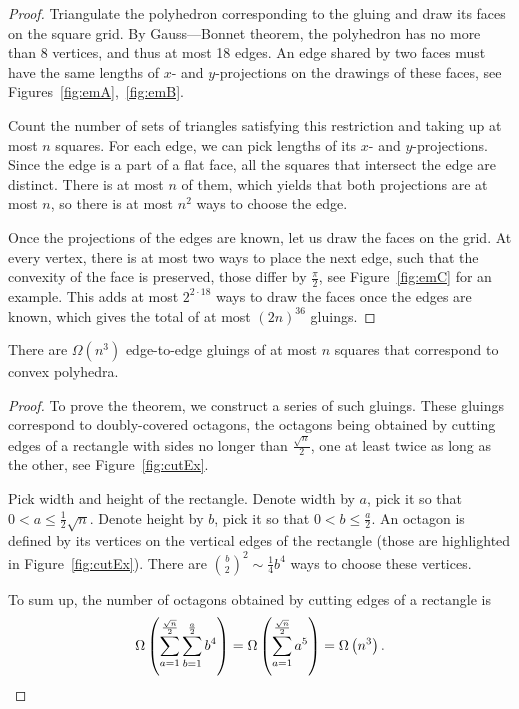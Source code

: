 \documentclass[a4paper,11pt]{article}
\begin{document}
\begin{proof}
	Triangulate the polyhedron corresponding to the gluing and draw its faces on the square grid. By Gauss—Bonnet theorem, the polyhedron has no more than 8 vertices, and thus at most 18 edges. An edge shared by two faces must have the same lengths of $x$- and $y$-projections on the drawings of these faces, see Figures~\ref{fig:emA},~\ref{fig:emB}.



Count the number of sets of triangles satisfying this restriction and taking up at most $n$ squares. For each edge, we can pick lengths of its $x$- and $y$-projections. Since the edge is a part of a flat face, all the squares that intersect the edge are distinct. There is at most $n$ of them, which yields that both projections are at most $n$, so there is at most $n^2$ ways to choose the edge.

Once the projections of the edges are known, let us draw the faces on the grid. At every vertex, there is at most two ways to place the next edge, such that the convexity of the face is preserved, those differ by $\frac{\pi}{2}$, see Figure~\ref{fig:emC} for an example. This adds at most $2^{2 \cdot 18}$ ways to draw the faces once the edges are known, which gives the total of at most $(2n)^{36}$ gluings.
\end{proof}

\begin{theorem} \label{thm:n3}
	There are $\Omega \left( n^3 \right)$ edge-to-edge gluings of at most $n$ squares that correspond to convex polyhedra.
\end{theorem}

\begin{proof}
To prove the theorem, we construct a series of such gluings. These gluings correspond to doubly-covered octagons, the octagons being obtained by cutting edges of a rectangle with sides no longer than $\frac{\sqrt{n}}{2}$, one at least twice as long as the other, see Figure~\ref{fig:cutEx}.



Pick width and height of the rectangle. Denote width by $a$, pick it so that $0 < a \le \frac12 \sqrt{n}$. Denote height by $b$, pick it so that $0 < b \le \frac{a}2$. An octagon is defined by its vertices on the vertical edges of the rectangle (those are highlighted in Figure~\ref{fig:cutEx}). There are $\binom{b}{2}^2 \sim \frac14 b^4$ ways to choose these vertices.

To sum up, the number of octagons obtained by cutting edges of a rectangle is
\[ \Omega\left( \sum\limits_{a=1}^{\frac{\sqrt{n}}{2}} \sum\limits_{b=1}^{\frac{a}{2}} b^4 \right) =
	\Omega\left( \sum\limits_{a=1}^{\frac{\sqrt{n}}{2}} a^5 \right) = \Omega \left( n^3 \right). \]

\end{proof}
\end{document}
